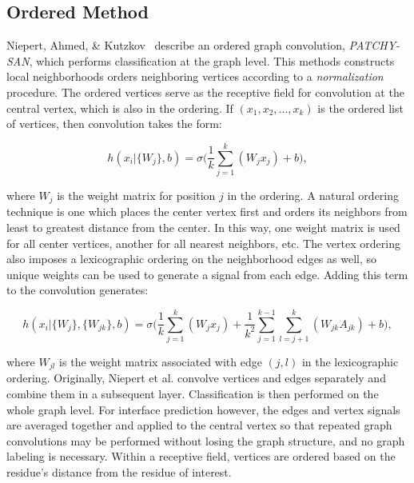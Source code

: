 \subsection{Ordered Method}

Niepert, Ahmed, \& Kutzkov~\cite{niepert2016} describe an ordered graph convolution, \emph{PATCHY-SAN}, which performs classification at the graph level.
This methods constructs local neighborhoods orders neighboring vertices according to a \emph{normalization} procedure.
The ordered vertices serve as the receptive field for convolution at the central vertex, which is also in the ordering. 
If $(x_1, x_2, ... , x_k)$ is the ordered list of vertices, then convolution takes the form:

\begin{equation}
h(x_i | \{ W_{j} \}, b)= \sigma \bigg( \frac{1}{k} \sum_{j=1}^{k}(W_{j} x_j) + b \bigg),
\label{eq:patchysan}
\end{equation}

\noindent
where $W_j$ is the weight matrix for position $j$ in the ordering.
A natural ordering technique is one which places the center vertex first and orders its neighbors from least to greatest distance from the center. 
In this way, one weight matrix is used for all center vertices, another for all nearest neighbors, etc.
The vertex ordering also imposes a lexicographic ordering on the neighborhood edges as well, so unique weights can be used to generate a signal from each edge. 
Adding this term to the convolution generates:

\begin{equation}
h(x_i | \{ W_{j} \}, \{ W_{jk} \}, b)= \sigma \bigg( \frac{1}{k} \sum_{j=1}^{k}(W_{j} x_j) + \frac{1}{k^2} \sum_{j = 1}^{k-1} \sum_{l=j+1}^{k}(W_{jk} A_{jk})  + b \bigg),
\label{eq:patchysan_2e}
\end{equation}

\noindent
where $W_{jl}$ is the weight matrix associated with edge $(j, l)$ in the lexicographic ordering.
Originally, Niepert et al. convolve vertices and edges separately and combine them in a subsequent layer.
Classification is then performed on the whole graph level.
For interface prediction however, the edges and vertex signals are averaged together and applied to the central vertex so that repeated graph convolutions may be performed without losing the graph structure, and no graph labeling is necessary.
Within a receptive field, vertices are ordered based on the residue's distance from the residue of interest.


